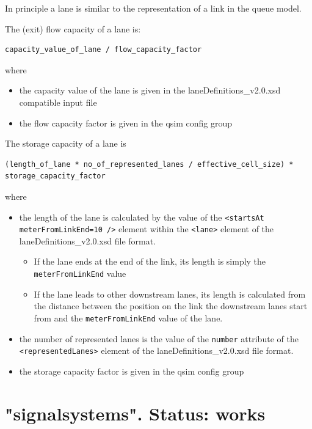 In principle a lane is similar to the representation of a link in the queue model. 

The (exit) flow capacity of a lane is:

\begin{verbatim}
capacity_value_of_lane / flow_capacity_factor
\end{verbatim}

where
\begin{itemize}
	\item the capacity value of the lane is given in the laneDefinitions\_v2.0.xsd compatible input file
	\item the flow capacity factor is given in the qsim config group
\end{itemize}

The storage capacity of a lane is

\begin{verbatim}
(length_of_lane * no_of_represented_lanes / effective_cell_size) * storage_capacity_factor
\end{verbatim}

where
\begin{itemize}
	\item the length of the lane is calculated by the value of the \verb$<startsAt meterFromLinkEnd=10 />$ element within the \verb$<lane>$ element of the laneDefinitions\_v2.0.xsd file format. \\
		\begin{itemize}
			\item If the lane ends at the end of the link, its length is simply the \verb$meterFromLinkEnd$ value
			\item If the lane leads to other downstream lanes, its length is calculated from the distance between the position on the link the downstream lanes start from and the \verb$meterFromLinkEnd$ value of the lane. 
		\end{itemize}
	\item the number of represented lanes is the value of the \verb$number$ attribute of the  \verb$<representedLanes>$ element of the laneDefinitions\_v2.0.xsd file format.
	\item the storage capacity factor is given in the qsim config group
\end{itemize}


\vfill\eject
\section{"signalsystems". Status: works}

